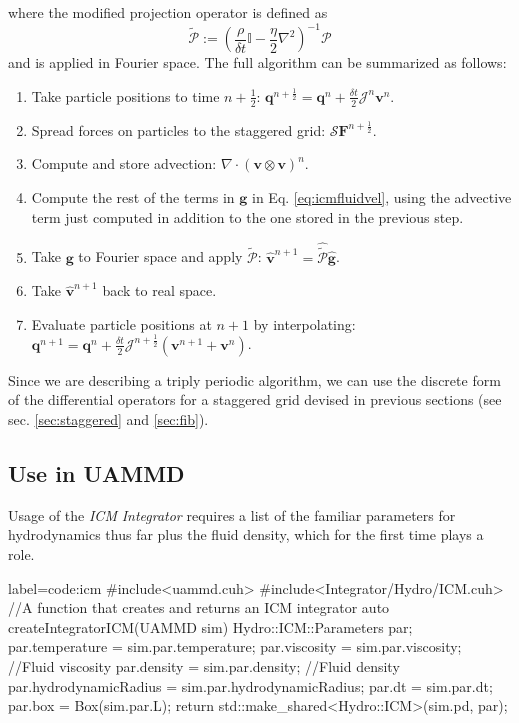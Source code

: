 \documentclass[twoside,openright,titlepage,numbers=noenddot,%
headinclude,footinclude,cleardoublepage=empty,abstract=on,
BCOR=5mm,fontsize=11pt, dvipsnames, paper=b5
]{scrreprt}
\renewcommand{\vec}[1]{\bm{#1}}
\newcommand{\oper}[1]{\mathcal{#1}}
\newcommand{\dt}{\delta t}
\newcommand{\half}{\frac{1}{2}}
\newcommand{\fou}[1]{\widehat{#1}}
\newcommand{\ppos}{q}
\newcommand{\fvel}{v}
\begin{document}
where the modified projection operator is defined as
\begin{equation}
  \tilde{\oper{P}} :=\left(\frac{\rho}{\dt}\mathbb{I} - \frac{\eta}{2}\nabla^2\right)^{-1}\oper{P}
\end{equation}
and is applied in Fourier space.
The full algorithm can be summarized as follows:
\begin{enumerate}
\item Take particle positions to time $n+\half$: $\vec{\ppos}^{n+\half} = \vec{\ppos}^n + \frac{\dt}{2}\oper{J}^n\vec{\fvel}^n$.
\item Spread forces on particles to the staggered grid: $\oper{S}\vec{F}^{n+\half}$.
\item Compute and store advection: $\nabla\cdot (\vec{\fvel}\otimes\vec{\fvel})^n$.
\item Compute the rest of the terms in $\vec{g}$ in Eq. \eqref{eq:icmfluidvel}, using the advective term just computed in addition to the one stored in the previous step.
\item Take $\vec{g}$ to Fourier space and apply $\tilde{\oper{P}}$: $\fou{\vec{\fvel}}^{n+1} = \fou{\tilde{\oper{P}}}\fou{\vec{g}}$.
\item Take $\fou{\vec{\fvel}}^{n+1}$ back to real space.
\item Evaluate particle positions at $n+1$ by interpolating: $\vec{\ppos}^{n+1} = \vec{\ppos}^n + \frac{\dt}{2}\oper{J}^{n+\half}\left(\vec{\fvel}^{n+1} + \vec{\fvel}^{n}\right)$.
\end{enumerate}
Since we are describing a triply periodic algorithm, we can use the discrete form of the differential operators for a staggered grid devised in previous sections (see sec. \ref{sec:staggered} and \ref{sec:fib}).


\subsection*{Use in UAMMD}
Usage of the \emph{ICM} \emph{Integrator} requires a list of the familiar parameters for hydrodynamics thus far plus the fluid density, which for the first time plays a role.

\begin{code2}{label=code:icm}
#include<uammd.cuh>
#include<Integrator/Hydro/ICM.cuh>
//A function that creates and returns an ICM integrator
auto createIntegratorICM(UAMMD sim){
  Hydro::ICM::Parameters par;
  par.temperature = sim.par.temperature;
  par.viscosity = sim.par.viscosity; //Fluid viscosity
  par.density = sim.par.density;   //Fluid density
  par.hydrodynamicRadius = sim.par.hydrodynamicRadius;
  par.dt = sim.par.dt;
  par.box = Box(sim.par.L);
  return std::make_shared<Hydro::ICM>(sim.pd, par);
}
\end{code2}
\end{document}
